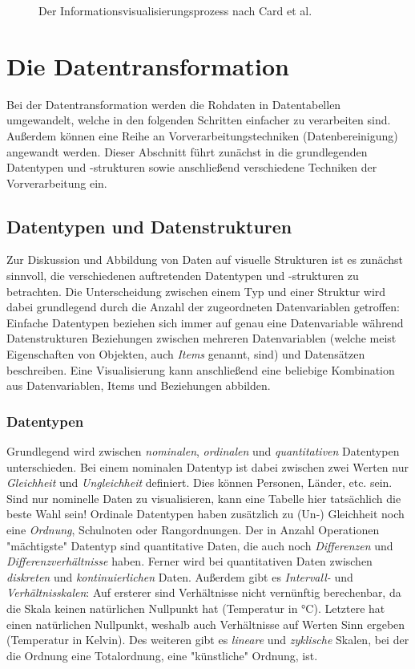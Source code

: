 	\begin{figure}
		\centering
		\tikzInfoVis
		\caption[Informationsvisualisierungsprozess]{Der Informationsvisualisierungsprozess nach Card et al.}
		\label{fig:visualisierungsprozess}
	\end{figure}

	\section{Die Datentransformation}
		\label{sec:dataTransformation}

		Bei der Datentransformation werden die Rohdaten in Datentabellen umgewandelt, welche in den folgenden Schritten einfacher zu verarbeiten sind. Außerdem können eine Reihe an Vorverarbeitungstechniken (\bspw Datenbereinigung) angewandt werden. Dieser Abschnitt führt zunächst in die grundlegenden Datentypen und -strukturen sowie anschließend verschiedene Techniken der Vorverarbeitung ein.

		\subsection{Datentypen und Datenstrukturen}
			Zur Diskussion und Abbildung von Daten auf visuelle Strukturen ist es zunächst sinnvoll, die verschiedenen auftretenden Datentypen und -strukturen zu betrachten. Die Unterscheidung zwischen einem Typ und einer Struktur wird dabei grundlegend durch die Anzahl der zugeordneten Datenvariablen getroffen: Einfache Datentypen beziehen sich immer auf genau eine Datenvariable während Datenstrukturen Beziehungen zwischen mehreren Datenvariablen (welche meist Eigenschaften von Objekten, auch \emph{Items} genannt, sind) und Datensätzen beschreiben. Eine Visualisierung kann anschließend eine beliebige Kombination aus Datenvariablen, Items und Beziehungen abbilden.

			\subsubsection{Datentypen}
				Grundlegend wird zwischen \emph{nominalen}, \emph{ordinalen} und \emph{quantitativen} Datentypen unterschieden. Bei einem nominalen Datentyp ist dabei zwischen zwei Werten nur \emph{Gleichheit} und \emph{Ungleichheit} definiert. Dies können \zB Personen, Länder, etc. sein. Sind nur nominelle Daten zu visualisieren, kann eine Tabelle hier tatsächlich die beste Wahl sein! Ordinale Datentypen haben zusätzlich zu (Un-) Gleichheit noch eine \emph{Ordnung}, \bspw Schulnoten oder Rangordnungen. Der in Anzahl Operationen "mächtigste" Datentyp sind quantitative Daten, die auch noch \emph{Differenzen} und \emph{Differenzverhältnisse} haben. Ferner wird bei quantitativen Daten zwischen \emph{diskreten} und \emph{kontinuierlichen} Daten. Außerdem gibt es \emph{Intervall-} und \emph{Verhältnisskalen}: Auf ersterer sind Verhältnisse nicht vernünftig berechenbar, da die Skala keinen natürlichen Nullpunkt hat (\bspw Temperatur in \si{\degreeCelsius}). Letztere hat einen natürlichen Nullpunkt, weshalb auch Verhältnisse auf Werten Sinn ergeben (\bspw Temperatur in Kelvin). Des weiteren gibt es \emph{lineare} und \emph{zyklische} Skalen, bei der die Ordnung eine Totalordnung, \bzw eine "künstliche" Ordnung, ist.

